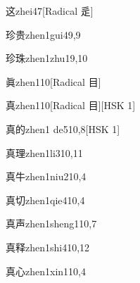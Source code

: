 \begin{entry}{这}{zhei4}{7}[Radical 辵]
\end{entry}

\begin{entry}{珍贵}{zhen1gui4}{9,9}
\end{entry}

\begin{entry}{珍珠}{zhen1zhu1}{9,10}
\end{entry}

\begin{entry}{眞}{zhen1}{10}[Radical 目]
\end{entry}

\begin{entry}{真}{zhen1}{10}[Radical 目][HSK 1]
\end{entry}

\begin{entry}{真的}{zhen1 de5}{10,8}[HSK 1]
\end{entry}

\begin{entry}{真理}{zhen1li3}{10,11}
\end{entry}

\begin{entry}{真牛}{zhen1niu2}{10,4}
\end{entry}

\begin{entry}{真切}{zhen1qie4}{10,4}
\end{entry}

\begin{entry}{真声}{zhen1sheng1}{10,7}
\end{entry}

\begin{entry}{真释}{zhen1shi4}{10,12}
\end{entry}

\begin{entry}{真心}{zhen1xin1}{10,4}
\end{entry}

